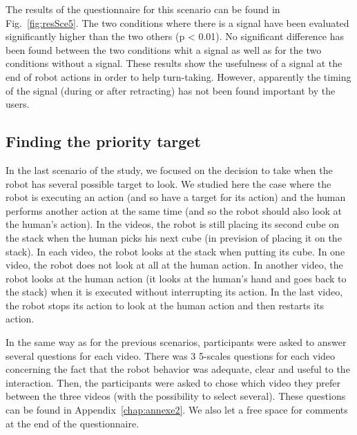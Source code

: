 \documentclass[english,a4paper,11pt,twoside]{StyleThese}
\begin{document}
The results of the questionnaire for this scenario can be found in Fig.~\ref{fig:resSce5}. The two conditions where there is a signal have been evaluated significantly higher than the two others (p < 0.01). No significant difference has been found between the two conditions whit a signal as well as for the two conditions without a signal. These results show the usefulness of a signal at the end of robot actions in order to help turn-taking. However, apparently the timing of the signal (during or after retracting) has not been found important by the users. 

\subsection{Finding the priority target}

In the last scenario of the study, we focused on the decision to take when the robot has several possible target to look. We studied here the case where the robot is executing an action (and so have a target for its action) and the human performs another action at the same time (and so the robot should also look at the human's action). In the videos, the robot is still placing its second cube on the stack when the human picks his next cube (in prevision of placing it on the stack). In each video, the robot looks at the stack when putting its cube. In one video, the robot does not look at all at the human action. In another video, the robot looks at the human action (it looks at the human's hand and goes back to the stack) when it is executed without interrupting its action. In the last video, the robot stops its action to look at the human action and then restarts its action.

In the same way as for the previous scenarios, participants were asked to answer several questions for each video. There was 3 5-scales questions for each video concerning the fact that the robot behavior was adequate, clear and useful to the interaction. Then, the participants were asked to chose which video they prefer between the three videos (with the possibility to select several). These questions can be found in Appendix~\ref{chap:annexe2}. We also let a free space for comments at the end of the questionnaire.
\end{document}
